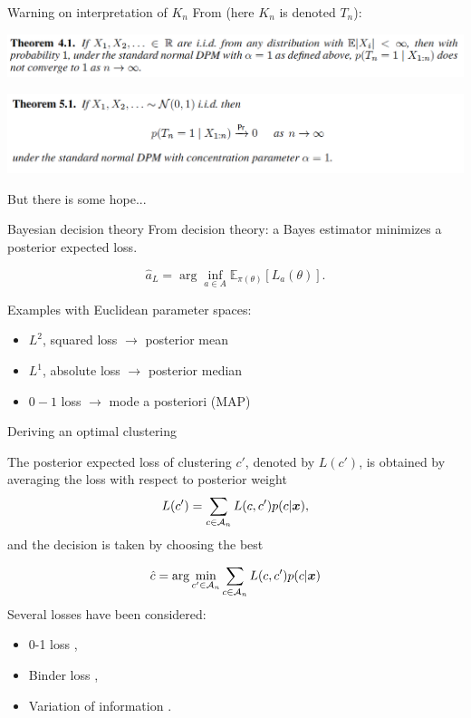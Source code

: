 \begin{frame}[allowframebreaks]{Warning on interpretation of $K_n$}
From \citet{miller2013simple} (here $K_n$ is denoted $T_n$):\bigskip

\includegraphics[width=\textwidth]{figures_julyan/mixtures/miller_inconsistency1}\bigskip

\includegraphics[width=\textwidth]{figures_julyan/mixtures/miller_inconsistency2}\bigskip


But there is some hope...
\end{frame}



\begin{frame}{Bayesian decision theory}
	From decision theory: a Bayes estimator minimizes a posterior expected loss.
	
\begin{equation*}
\hat{a}_L = \arg \inf_{a \in A} \mathbb{E}_{\pi(\theta)}[L_a(\theta)].
\end{equation*}\pause

Examples with Euclidean parameter spaces:
\begin{itemize}
	\item $L^2$, squared loss $\longrightarrow$ posterior mean
	\item $L^1$, absolute loss $\longrightarrow$ posterior median
	\item $0-1$ loss  $\longrightarrow$ mode a posteriori (MAP)
\end{itemize}
\end{frame}

\begin{frame}{Deriving an optimal clustering}

The posterior expected loss of clustering $c'$, denoted by $L(c')$, is obtained by \alert{averaging the loss with respect to posterior weight}
$$L(c') = \sum_{c\in\mathcal{A}_n} L(c,c')p(c|\boldsymbol{x}),$$
and the decision is taken by choosing the best

\begin{equation*}
\hat c = \arg \min_{c' \in \mathcal{A}_n} \sum_{c\in\mathcal{A}_n} L(c,c')p(c|\boldsymbol{x})
\end{equation*}\pause
Several losses have been considered:
	\begin{itemize}
		\item 0-1 loss \citep{rajkowski2019analysis},
		\item Binder loss \citep{dahl2006model},
		\item Variation of information \citep{wade2018bayesian}.
	\end{itemize}
\end{frame}

